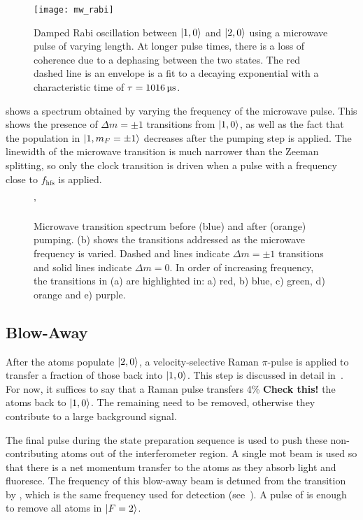 \begin{figure}[!htbp]
    \centering
    \texttt{[image: mw\_rabi]}
    \caption[Microwave Rabi oscillation between \(\ket{1,0}\) and \(\ket{2,0}\)]{Damped Rabi oscillation between \(\ket{1,0}\) and \(\ket{2,0}\) using a microwave pulse of varying length. At longer pulse times, there is a loss of coherence due to a dephasing between the two states. The red dashed line is an envelope is a fit to a decaying exponential with a characteristic time of \(\tau = \sivalue{1016}{\micro\second}\).}
    \label{fig:mw_rabi}
\end{figure}
\par\noindent
{} shows a spectrum obtained by
varying the frequency of the microwave pulse. This shows the presence
of \(\Delta m = \pm 1 \) transitions from \(\ket{1,0}\), as well as
the fact that the population in \(\ket{1,m_F=\pm 1}\) decreases after
the  pumping step is applied. The linewidth of the
microwave transition is much narrower than the Zeeman splitting, so
only the clock transition is driven when a pulse with a frequency
close to \(f_\text{hfs}\) is applied.
\begin{figure}[!htbp]
    \centering
    \def\svgwidth{\columnwidth}
    \subfloat[][]{\scalebox{0.4}{}\label{fig:microwave_spectrum}}
    \subfloat[][]{\scalebox{0.4}{\raisebox{4ex}{}}}
    \caption[Microwave transition spectrum]{Microwave transition spectrum before (blue) and after (orange)  pumping. (b) shows the transitions addressed as the microwave frequency is varied. Dashed and lines indicate \(\Delta m = \pm 1\) transitions and solid lines indicate \(\Delta m = 0\). In order of increasing frequency, the transitions in (a) are highlighted in: a) red, b) blue, c) green, d) orange and e) purple.} 
    \label{fig:microwave_data}'
\end{figure}

\subsection{Blow-Away}\label{subsec:blow_away}
After the atoms populate \(\ket{2,0}\), a velocity-selective Raman
\(\pi\)-pulse is applied to transfer a fraction of those back into
\(\ket{1,0}\). This step is discussed in detail
in~. For now, it suffices to
say that a Raman pulse transfers 4\% \textbf{Check this!} the atoms
back to \(\ket{1,0}\). The remaining need to be removed, otherwise
they contribute to a large background signal. \par\noindent
The final pulse during the state preparation sequence is used to push
these non-contributing atoms out of the interferometer region. A
single \ac{mot} beam is used so that there is a net momentum transfer
to the atoms as they absorb light and fluoresce. The frequency of this
blow-away beam is detuned from the  transition by
, which is the same frequency used for
detection (see~). A pulse of
 is enough to remove all atoms in
\(\ket{F=2}\). 


